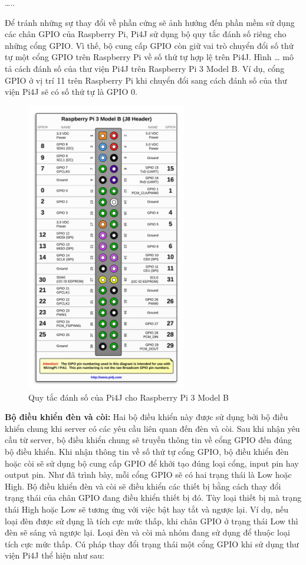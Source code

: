 \documentclass[11pt,a4paper,oneside]{book}
\begin{document}
…..

Để tránh những sự thay đổi về phần cứng sẽ ảnh hưởng đến phần mềm sử dụng các chân GPIO của Raspberry Pi, Pi4J sử dụng bộ quy tắc đánh số riêng cho những cổng GPIO. Vì thế, bộ cung cấp GPIO còn giữ vai trò chuyển đổi số thứ tự một cổng GPIO trên Raspberry Pi về số thứ tự hợp lệ trên Pi4J. Hình … mô tả cách đánh số của thư viện Pi4J trên Raspberry Pi 3 Model B. Ví dụ, cổng GPIO ở vị trí 11 trên Raspberry Pi khi chuyển đổi sang cách đánh số của thư viện Pi4J sẽ có số thứ tự là GPIO 0.

\begin{figure}[h]
  \centering
     \includegraphics[width=7cm]{4-pi4j-danh-so}
  \caption{Quy tắc đánh số của Pi4J cho Raspberry Pi 3 Model B}\label{fig:4-pi4j-danh-so}
\end{figure}

\textbf{Bộ điều khiển đèn và còi:} Hai bộ điều khiển này được sử dụng bởi bộ điều khiển chung khi server có các yêu cầu liên quan đến đèn và còi. Sau khi nhận yêu cầu từ server, bộ điều khiển chung sẽ truyền thông tin về cổng GPIO đến đúng bộ điều khiển. Khi nhận thông tin về số thứ tự cổng GPIO, bộ điều khiển đèn hoặc còi sẽ sử dụng bộ cung cấp GPIO để khởi tạo đúng loại cổng, input pin hay output pin.
Như đã trình bày, mỗi cổng GPIO sẽ có hai trạng thái là Low hoặc High. Bộ điều khiển đèn và còi sẽ điều khiển các thiết bị bằng cách thay đổi trạng thái của chân GPIO đang điều khiển thiết bị đó. Tùy loại thiết bị mà trạng thái High hoặc Low sẽ tương ứng với việc bật hay tắt và ngược lại. Ví dụ, nếu loại đèn được sử dụng là tích cực mức thấp, khi chân GPIO ở trạng thái Low thì đèn sẽ sáng và ngược lại. Loại đèn và còi mà nhóm đang sử dụng để thuộc loại tích cực mức thấp. Cú pháp thay đổi trạng thái một cổng GPIO khi sử dụng thư viện Pi4J thể hiện như sau:
\end{document}

